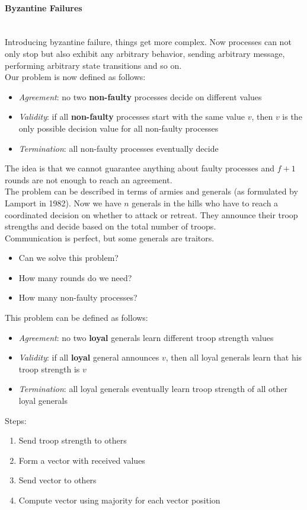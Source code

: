 \documentclass[10pt,a4paper]{article}
\newcommand{\myparagraph}[1]{\paragraph{#1}\mbox{}\\[0.05in]}
\begin{document}
\myparagraph{Byzantine Failures}
Introducing byzantine failure, things get more complex. Now processes can not only stop but also exhibit any arbitrary behavior, sending arbitrary message, performing arbitrary state transitions and so on. \\ 
Our problem is now defined as follows:
\begin{itemize}
	\item \textit{Agreement}: no two \textbf{non-faulty} processes decide on different values
	\item \textit{Validity}: if all \textbf{non-faulty} processes start with the same value $v$, then $v$ is the only possible decision value for all non-faulty processes
	\item \textit{Termination}: all non-faulty processes eventually decide
\end{itemize}
The idea is that we cannot guarantee anything about faulty processes and $f+1$ rounds are not enough to reach an agreement. \\
The problem can be described in terms of armies and generals (as formulated by Lamport in 1982). Now we have $n$ generals in the hills who have to reach a coordinated decision on whether to attack or retreat. They announce their troop strengths and decide based on the total number of troops. \\ Communication is perfect, but some generals are traitors. 
\begin{itemize}
	\item Can we solve this problem?
	\item How many rounds do we need?
	\item How many non-faulty processes?
\end{itemize}
This problem can be defined as follows:
\begin{itemize}
	\item \textit{Agreement}: no two \textbf{loyal} generals learn different troop strength values
	\item \textit{Validity}: if all \textbf{loyal} general announces $v$, then all loyal generals learn that his troop strength is $v$
	\item \textit{Termination}: all loyal generals eventually learn troop strength of all other loyal generals
\end{itemize}
Steps:
\begin{enumerate}
	\item Send troop strength to others
	\item Form a vector with received values
	\item Send vector to others
	\item Compute vector using majority for each vector position
\end{enumerate}
\end{document}

